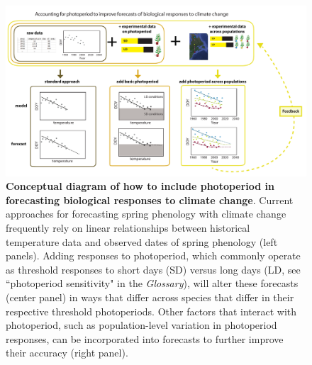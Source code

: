 \documentclass{article}
\begin{document}
\begin{figure}[p]
\includegraphics{..//..//analyses/photoperiod/figures/photocondiag6.pdf} 
\caption{\textbf{Conceptual diagram of how to include photoperiod in forecasting biological responses to climate change}. Current approaches for forecasting spring phenology with climate change frequently rely on linear relationships between historical temperature data and observed dates of spring phenology (left panels). Adding responses to photoperiod, which commonly operate as threshold responses to short days (SD) versus long days (LD, see ``photoperiod sensitivity" in the \emph{Glossary}), will alter these forecasts (center panel) in ways that differ across species that differ in their respective threshold photoperiods. Other factors that interact with photoperiod, such as population-level variation  in photoperiod responses, can be incorporated into forecasts to further improve their accuracy (right panel).}
 \label{fig:condiag}
 \end{figure}
 




\end{document}
